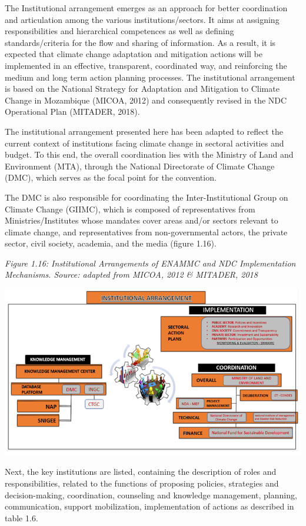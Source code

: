 \documentclass[
]{book}
\begin{document}
The Institutional arrangement emerges as an approach for better coordination and articulation among the various institutions/sectors. It aims at assigning responsibilities and hierarchical competences as well as defining standards/criteria for the flow and sharing of information. As a result, it is expected that climate change adaptation and mitigation actions will be implemented in an effective, transparent, coordinated way, and reinforcing the medium and long term action planning processes. The institutional arrangement is based on the National Strategy for Adaptation and Mitigation to Climate Change in Mozambique (MICOA, 2012) and consequently revised in the NDC Operational Plan (MITADER, 2018).

The institutional arrangement presented here has been adapted to reflect the current context of institutions facing climate change in sectoral activities and budget. To this end, the overall coordination lies with the Ministry of Land and Environment (MTA), through the National Directorate of Climate Change (DMC), which serves as the focal point for the convention.

The DMC is also responsible for coordinating the Inter-Institutional Group on Climate Change (GIIMC), which is composed of representatives from Ministries/Institutes whose mandates cover areas and/or sectors relevant to climate change, and representatives from non-governmental actors, the private sector, civil society, academia, and the media (figure 1.16).

\emph{Figure 1.16: Institutional Arrangements of ENAMMC and NDC Implementation Mechanisms. Source: adapted from MICOA, 2012 \& MITADER, 2018}

\includegraphics{Figure26.png}

Next, the key institutions are listed, containing the description of roles and responsibilities, related to the functions of proposing policies, strategies and decision-making, coordination, counseling and knowledge management, planning, communication, support mobilization, implementation of actions as described in table 1.6.
\end{document}
